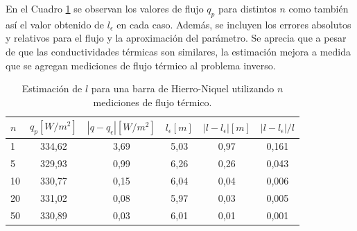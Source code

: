 En el Cuadro \ref{tb_ej_4} se observan los valores de flujo $q_p$ para distintos $n$ como tambi\'en as\'i el valor obtenido de $l_\epsilon$ en cada caso. Adem\'as, 
se incluyen los errores absolutos y relativos para el flujo y la aproximaci\'on del par\'ametro. 
Se aprecia que a pesar de que las conductividades t\'ermicas son similares, la estimaci\'on mejora a medida que se agregan mediciones de flujo t\'ermico al problema inverso. 

\begin{table}[h!]
\begin{center}
{\begin{tabular}{lccccc} \toprule
$n$      &     $q_p \left[W/m{^{2}}\right]$     &   $\left|q-q_\epsilon\right| \left[W/m{^{2}}\right]$      &    $l_\epsilon \left[m\right]$     &    $\left|l-l_\epsilon\right| [m]$ & $\left|l-l_\epsilon\right|/l $   \\ \bottomrule
  1       &           334,62                      &                         3,69                              &                  5,03            &                0,97       &     0,161         \\        
  5      &           329,93                      &                         0,99                               &                 6,26             &                0,26       &     0,043      \\ 
	10		 &           330,77                       &                        0,15                                &               6,04              &                 0,04      &     0,006     \\ 
	20	  &           331,02                       &                      0,08                                 &               5,97               &                  0,03      &      0,005           \\ 
	50   &             330,89                       &                     0,03                                    &             6,01              &                 0,01       &     0,001    \\ \bottomrule
\end{tabular}}
\end{center}
\vspace{-0.3cm} 
\caption{Estimaci\'on de $l$ para una barra de Hierro-Niquel utilizando $n$ mediciones de flujo t\'ermico.}
\label{tb_ej_4}
\end{table}


